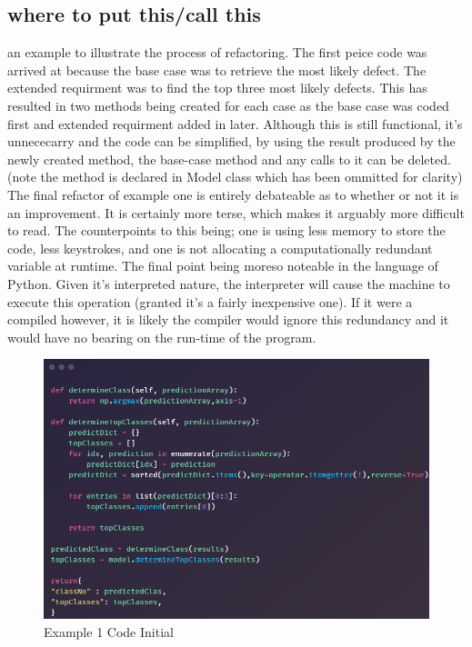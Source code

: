       \subsection{where to put this/call this}
      an example to illustrate the process of refactoring. The first peice code was arrived at because the base case was to retrieve the most likely defect. The extended requirment was to find the top three most likely defects. This has resulted in two methods being created for each case as the base case was coded first and extended requirment added in later. Although this is still functional, it's unnececarry and the code can be simplified, by using the result produced by the newly created method, the base-case method and any calls to it can be deleted. (note the method is declared in Model class which has been ommitted for clarity) The final refactor of example one is entirely debateable as to whether or not it is an improvement. It is certainly more terse, which makes it arguably more difficult to read. The counterpoints to this being; one is using less memory to store the code, less keystrokes, and one is not allocating a computationally redundant variable at runtime. The final point being moreso noteable in the language of Python. Given it's interpreted nature, the interpreter will cause the machine to execute this operation (granted it's a fairly inexpensive one). If it were a compiled however, it is likely the compiler would ignore this redundancy and it would have no bearing on the run-time of the program.

      \begin{figure}[H]
        \begin{center}
          \includegraphics[scale=0.5]{Images/Refactor/refactorA1}
          \caption{Example 1 Code Initial}
          \label{fig:refactorA1}
        \end{center}
      \end{figure}

